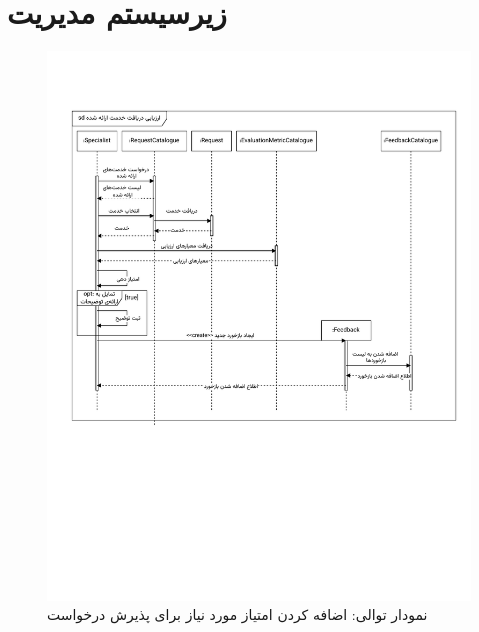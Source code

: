 \section{زیرسیستم مدیریت}
\FloatBarrier
\begin{figure}[ht!]
	\centering
	\includegraphics[scale=0.8, page=7]{figs/OOD-Sequence-3.pdf}
	\caption{نمودار توالی: اضافه کردن امتیاز مورد نیاز برای پذیرش درخواست}
\end{figure}
\FloatBarrier
\newpage


